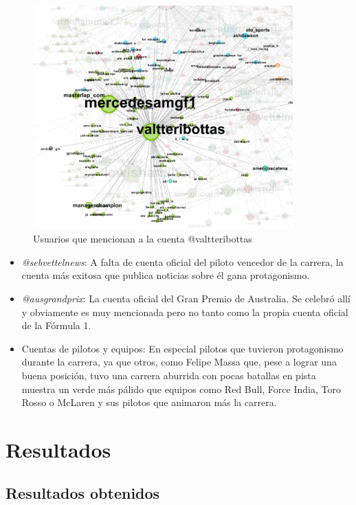 \begin{figure}[H]
	\centering
	\includegraphics[width=10cm]{img/valtteribottas-mentions}
	\caption{Usuarios que mencionan a la cuenta @valtteribottas}
	\label{fig:valtteribottas-mentions}
\end{figure}

\begin{itemize}	
	\item \textit{@sebvettelnews}: A falta de cuenta oficial del piloto vencedor de la carrera, la cuenta más exitosa que publica noticias sobre él gana protagonismo.
	\item \textit{@ausgrandprix}: La cuenta oficial del Gran Premio de Australia. Se celebró allí y obviamente es muy mencionada pero no tanto como la propia cuenta oficial de la Fórmula 1.
	\item Cuentas de pilotos y equipos: En especial pilotos que tuvieron protagonismo durante la carrera, ya que otros, como Felipe Massa que, pese a lograr una buena posición, tuvo una carrera aburrida con pocas batallas en pista muestra un verde más pálido que equipos como Red Bull, Force India, Toro Rosso o McLaren y sus pilotos que animaron más la carrera.
\end{itemize}

\section{Resultados}

\subsection{Resultados obtenidos}

